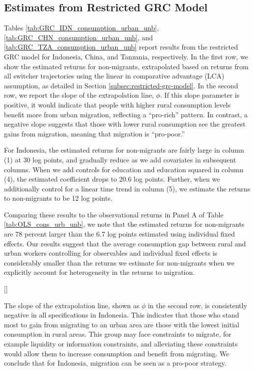 \documentclass[12pt]{article}
\begin{document}
\subsection{Estimates from Restricted GRC Model}\label{sec:grc-returns}

Tables \ref{tab:GRC_IDN_consumption_urban_unb}, \ref{tab:GRC_CHN_consumption_urban_unb}, and \ref{tab:GRC_TZA_consumption_urban_unb} report results from the restricted GRC model for Indonesia, China, and Tanzania, respectively.
In the first row, we show the estimated returns for non-migrants, extrapolated based on returns from all switcher trajectories using the linear in comparative advantage (LCA) assumption, as detailed in Section \ref{subsec:restricted-grc-model}. 
In the second row, we report the slope of the extrapolation line, $\phi$.
If this slope parameter is positive, it would indicate that people with higher rural consumption levels benefit more from urban migration, reflecting a ``pro-rich'' pattern. 
In contrast, a negative slope suggests that those with lower rural consumption see the greatest gains from migration, meaning that migration is ``pro-poor.''

For Indonesia, the estimated returns for non-migrants are fairly large in column (1) at 30 log points, and gradually reduce as we add covariates in subsequent columns.
When we add controls for education and education squared in column (4), the estimated coefficient drops to 20.6 log points. 
Further, when we additionally control for a linear time trend in column (5), we estimate the returns to non-migrants to be 12 log points.

Comparing these results to the observational returns in Panel A of Table \ref{tab:OLS_cons_urb_unb}, we note that the estimated returns for non-migrants are 78 percent larger than the 6.7 log points estimated using individual fixed effects.
Our results suggest that the average consumption gap between rural and urban workers controlling for observables and individual fixed effects is considerably smaller than the returns we estimate for non-migrants when we explicitly account for heterogeneity in the returns to migration.

[\GRCnotesIDNcanonical]


The slope of the extrapolation line, shown as $\phi$ in the second row, is consistently negative in all specifications in Indonesia. This indicates that those who stand most to gain from migrating to an urban area are those with the lowest initial consumption in rural areas. This group may face constraints to migrate, for example liquidity or information constraints, and alleviating these constraints would allow them to increase consumption and benefit from migrating. 
We conclude that for Indonesia, migration can be seen as a pro-poor strategy.
\end{document}
